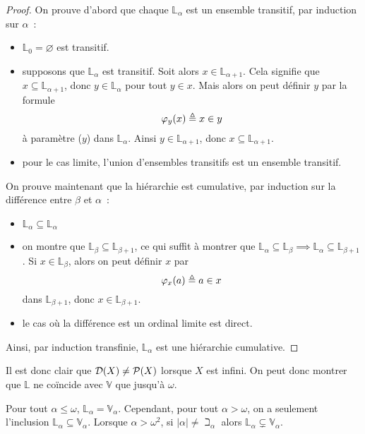 \begin{proof}
  On prouve d'abord que chaque $\mathbb L_\alpha$ est un ensemble transitif,
  par induction sur $\alpha$~:
  \begin{itemize}
  \item $\mathbb L_0 = \varnothing$ est transitif.
  \item supposons que $\mathbb L_\alpha$ est transitif. Soit alors
    $x \in \mathbb L_{\alpha + 1}$. Cela signifie que
    $x\subseteq \mathbb L_{\alpha + 1}$, donc $y \in \mathbb L_\alpha$ pour tout
    $y \in x$. Mais alors on peut définir $y$ par la formule
    \[\varphi_y(x) \triangleq x \in y\]
    à paramètre ($y$) dans $\mathbb L_\alpha$. Ainsi
    $y \in \mathbb L_{\alpha + 1}$, donc $x \subseteq \mathbb L_{\alpha + 1}$.
  \item pour le cas limite, l'union d'ensembles transitifs est un ensemble
    transitif.
  \end{itemize}

  On prouve maintenant que la hiérarchie est cumulative, par induction sur
  la différence entre $\beta$ et $\alpha$~:
  \begin{itemize}
  \item $\mathbb L_\alpha \subseteq \mathbb L_\alpha$
  \item on montre que $\mathbb L_{\beta}\subseteq \mathbb L_{\beta + 1}$, ce qui
    suffit à montrer que $\mathbb L_\alpha \subseteq \mathbb L_\beta \implies
    \mathbb L_\alpha \subseteq \mathbb L_{\beta + 1}$.
    Si $x \in \mathbb L_{\beta}$, alors on peut définir $x$ par
    \[\varphi_x(a) \triangleq a \in x\]
    dans $\mathbb L_{\beta + 1}$, donc $x \in \mathbb L_{\beta + 1}$.
  \item le cas où la différence est un ordinal limite est direct.
  \end{itemize}
  Ainsi, par induction transfinie, $\mathbb L_\alpha$ est une hiérarchie
  cumulative.
\end{proof}

Il est donc clair que $\mathcal{D}(X)\neq \mathcal{P}(X)$ lorsque $X$ est infini.
On peut donc montrer que $\mathbb L$ ne coïncide avec $\mathbb V$ que jusqu'à
$\omega$.

\begin{proposition}
  Pour tout $\alpha \leq \omega$, $\mathbb L_\alpha = \mathbb V_\alpha$.
  Cependant, pour tout $\alpha > \omega$, on a seulement l'inclusion
  $\mathbb L_\alpha \subseteq \mathbb V_\alpha$. Lorsque $\alpha > \omega^2$,
  si $|\alpha| \neq \beth_\alpha$ alors
  $\mathbb L_\alpha \subsetneq \mathbb V_\alpha$.
\end{proposition}

